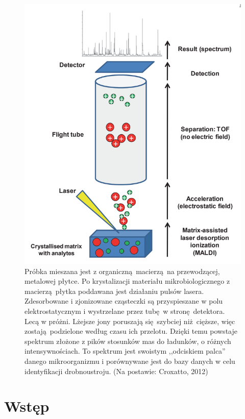 \documentclass[two column, twoside, a4paper]{article}
\begin{document}
\begin{figure}[t]
\begin{tcolorbox}
	\includegraphics[width=\textwidth]{./figures/maldi-tof.png}
	\caption{Próbka mieszana jest z organiczną macierzą na przewodzącej, metalowej płytce. Po krystalizacji materiału mikrobiologicznego z macierzą płytka poddawana jest działaniu pulsów lasera. Zdesorbowane i zjonizowane cząsteczki są przyspieszane w polu elektrostatycznym i wystrzelane przez tubę w stronę detektora. Lecą w próżni. Lżejsze jony poruszają się szybciej niż cięższe, więc zostają podzielone według czasu ich przelotu. Dzięki temu powstaje spektrum złożone z pików stosunków mas do ładunków, o różnych intensywnościach. To spektrum jest swoistym ,,odciskiem palca'' danego mikroorganizmu i porównywane jest do bazy danych w celu identyfikacji drobnoustroju. (Na postawie: Croxatto, 2012)}\label{fig::maldi-tof.png}
\end{tcolorbox}
\vspace{-1.8em}
\end{figure}

\section{Wstęp}
\end{document}
